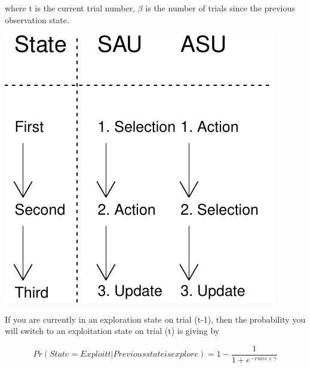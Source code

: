 \documentclass[a4paper,doc,natbib,floatsintext]{apa6}\usepackage[]{graphicx}\usepackage[]{color}
\makeatletter
\def\maxwidth{ %
  \ifdim\Gin@nat@width>\linewidth
    \linewidth
  \else
    \Gin@nat@width
  \fi
}
\newenvironment{knitrout}{}{} %
\makeatother
\begin{document}
where t is the current trial number, $\beta$ is the number of trials since the previous observation state. 

\begin{knitrout}
\color{fgcolor}
\includegraphics[width=\maxwidth]{figure/unnamed-chunk-1-1} 

\end{knitrout}




If you are currently in an exploration state on trial (t-1), then the probability you will switch to an exploitation state on trial (t) is giving by

\begin{center}
\begin{equation}
\label{eq:modeswitch2}

Pr(State=Exploit{t} | Previous state is explore)= 1-\frac{1}{1 + e^{-runs \times \gamma}}

\end{equation}
\end{center}



































\end{document}
